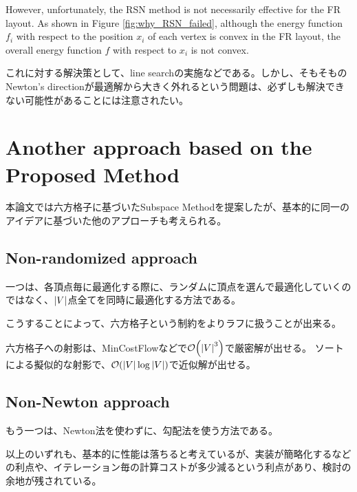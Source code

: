 \documentclass[dvipdfmx,lettersize,journal]{IEEEtran}
\begin{document}
However, unfortunately, the RSN method is not necessarily effective for the FR layout.
As shown in Figure \ref{fig:why_RSN_failed}, although the energy function \( f_i \) with respect to the position \( x_i \) of each vertex is convex in the FR layout, the overall energy function \( f \) with respect to \( x_i \) is not convex.

これに対する解決策として、line searchの実施などである。しかし、そもそものNewton's directionが最適解から大きく外れるという問題は、必ずしも解決できない可能性があることには注意されたい。

\section{Another approach based on the Proposed Method}\label{sec:anotherApproach}

本論文では六方格子に基づいたSubspace Methodを提案したが、基本的に同一のアイデアに基づいた他のアプローチも考えられる。

\subsection{Non-randomized approach}\label{ssec:nonRandom}
一つは、各頂点毎に最適化する際に、ランダムに頂点を選んで最適化していくのではなく、$\abs{V}$点全てを同時に最適化する方法である。

こうすることによって、六方格子という制約をよりラフに扱うことが出来る。

六方格子への射影は、MinCostFlowなどで$\order{\abs{V}^3}$で厳密解が出せる。
ソートによる擬似的な射影で、$\order{\abs{V} \log \abs{V}}$で近似解が出せる。

\subsection{Non-Newton approach}\label{ssec:nonNewton}

もう一つは、Newton法を使わずに、勾配法を使う方法である。

以上のいずれも、基本的に性能は落ちると考えているが、実装が簡略化するなどの利点や、イテレーション毎の計算コストが多少減るという利点があり、検討の余地が残されている。
\end{document}
